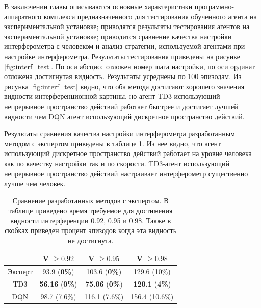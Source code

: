 В заключении главы описываются основные характеристики программно-аппаратного комплекса предназначенного для тестирования обученного агента на экспериментальной установке; приводятся результаты тестирования агентов на экспериментальной установке; приводится сравнение качества настройки интерферометра с человеком и анализ стратегии, используемой агентами при настройке интерферометра. Результаты тестирования приведены на рисунке \ref{fig:interf_test}. По оси абсцисс отложен номер шага настройки, по оси ординат отложена достигнутая видность. Результаты усреднены по 100 эпизодам. Из рисунка \ref{fig:interf_test} видно, что оба метода достигают хорошего значения видности интерференционной картины, но агент TD3 использующий непрерывное пространство действий работает быстрее и достигает лучшей видности чем DQN агент использующий дискретное пространство действий. 

Результаты сравнения качества настройки интерферометра разработанным методом с экспертом приведены в таблице \ref{tab:human}. Из нее видно, что агент использующий дискретное пространство действий работает на уровне человека как по качеству настройки так и по скорости. TD3-агент использующий непрерывное пространство действий настраивает интерферометр существенно лучше чем человек. 

\begin{table} [htbp]
    \centering
    \begin{threeparttable}%
        \caption{Сравнение разработанных методов с экспертом. В таблице приведено время требуемое для достижения видности интерференции 0.92, 0.95 и 0.98. Также в скобках приведен процент эпизодов когда эта видность не достигнута.}
        \begin{tabular}{|c|c|c|c|}
            \hline
            \hline
             &V $\ge 0.92$ & V $\ge 0.95$ & V $\ge 0.98$\\\midrule 
            \hline
            Эксперт &  93.9 (\textbf{0\%})  & 103.6 (\textbf{0\%}) & 129.6 (10\%)\\
            \hline
            TD3 &  \textbf{56.16} (\textbf{0\%}) & \textbf{75.06} (\textbf{0\%}) & \textbf{120.1} (\textbf{4\%})\\
            \hline
            DQN &  98.7 (7.6\%) & 116.1 (7.6\%) & 156.4 (10.6\%)\\
            \hline
            \hline
        \end{tabular}
        \label{tab:human}
    \end{threeparttable}
\end{table}


